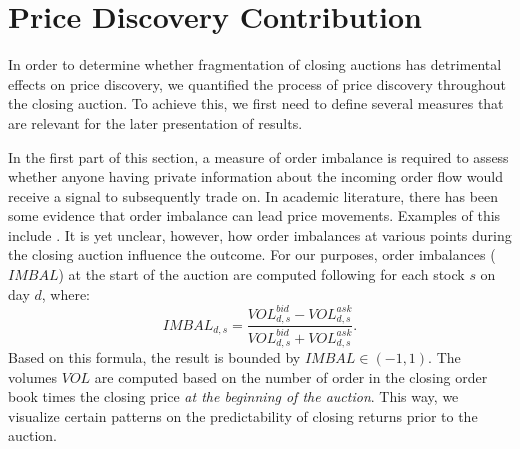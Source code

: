 \documentclass[11pt,a4paper]{article}
\begin{document}
    \section{Price Discovery Contribution}

    In order to determine whether fragmentation of closing auctions has detrimental effects on price discovery, we quantified the process of price discovery throughout the closing auction. To achieve this, we first need to define several measures that are relevant for the later presentation of results.

    In the first part of this section, a measure of order imbalance is required to assess whether anyone having private information about the incoming order flow would receive a signal to subsequently trade on. In academic literature, there has been some evidence that order imbalance can lead price movements. Examples of this include \textcite{ChordiaRollSubrahmanyam2008,ChordiaRollSubrahmanyam2005}. It is yet unclear, however, how order imbalances at various points during the closing auction influence the outcome. For our purposes, order imbalances ($IMBAL$) at the start of the auction are computed following \textcite{HoldenJacobsen2014,ChordiaRollSubrahmanyam2002,ChordiaSubrahmanyam2004} for each stock $s$ on day $d$, where:
    \[ IMBAL_{d,s} = \frac{VOL^{bid}_{d,s} - VOL^{ask}_{d,s}}{VOL^{bid}_{d,s} + VOL^{ask}_{d,s}}. \]
    Based on this formula, the result is bounded by $IMBAL \in (-1,1)$. The volumes $VOL$ are computed based on the number of order in the closing order book times the closing price \emph{at the beginning of the auction}. This way, we visualize certain patterns on the predictability of closing returns prior to the auction.
\end{document}
